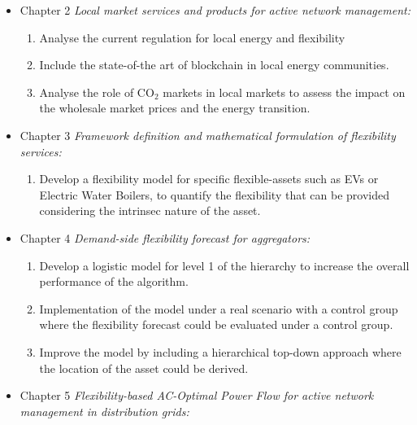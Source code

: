\begin{itemize}
\item Chapter 2 \textit{Local market services and products for active network management:} 
	\begin{enumerate}
		\item Analyse the current regulation for local energy and flexibility 
		\item Include the state-of-the art of blockchain in local energy communities. 
		\item Analyse the role of CO$_2$ markets in local markets to assess the impact on the wholesale market prices and the energy transition. 
	\end{enumerate}
\item Chapter 3 \textit{Framework definition and mathematical formulation of flexibility services:} 
	\begin{enumerate}
		\item Develop a flexibility model for specific flexible-assets such as EVs or Electric Water Boilers, to quantify the flexibility that can be provided considering the intrinsec nature of the asset. 
	\end{enumerate}
\item Chapter 4 \textit{Demand-side flexibility forecast for aggregators:} 
	\begin{enumerate}
		\item Develop a logistic model for level 1 of the hierarchy to increase the overall performance of the algorithm. 
		\item Implementation of the model under a real scenario with a control group where the flexibility forecast could be evaluated under a control group.  
		\item Improve the model by including a hierarchical top-down approach where the location of the asset could be derived. 
	\end{enumerate}
\item Chapter 5 \textit{Flexibility-based AC-Optimal Power Flow for active network management in distribution grids:} 
	\begin{enumerate}

\end{enumerate}
\end{itemize}
